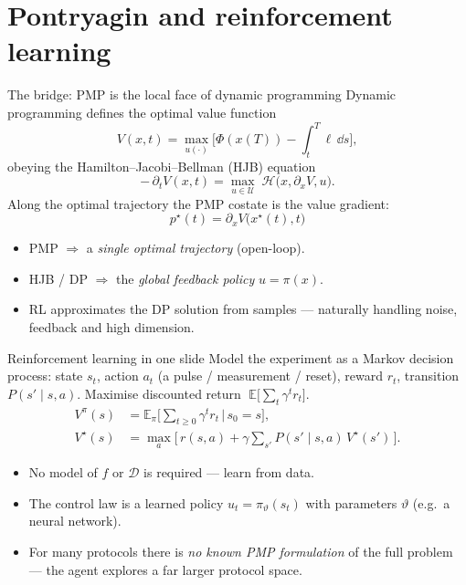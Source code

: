 \documentclass[10pt,aspectratio=169]{beamer}
\newcommand{\Hc}{\mathcal{H}}                 %
\begin{document}
\section{Pontryagin and reinforcement learning}

\begin{frame}{The bridge: PMP is the local face of dynamic programming}
  Dynamic programming defines the optimal value function
  \[
    V(x,t)=\max_{u(\cdot)}\Big[\Phi(x(T))-\!\int_t^T\!\ell\,\dd s\Big],
  \]
  obeying the \alert{Hamilton--Jacobi--Bellman (HJB)} equation
  \begin{equation}
    -\,\partial_t V(x,t) = \max_{u\in\mathcal{U}}\;\Hc\big(x,\partial_x V,u\big).
  \end{equation}
  Along the optimal trajectory the PMP costate is the value gradient:
  \begin{equation}
    \boxed{\;p^\star(t) = \partial_x V\big(x^\star(t),t\big)\;}
  \end{equation}
  \begin{itemize}
    \item PMP $\Rightarrow$ a \emph{single optimal trajectory} (open-loop).
    \item HJB / DP $\Rightarrow$ the \emph{global feedback policy} $u=\pi(x)$.
    \item RL approximates the DP solution from samples --- naturally handling
          noise, feedback and high dimension.
  \end{itemize}
\end{frame}

\begin{frame}{Reinforcement learning in one slide}
  Model the experiment as a Markov decision process: state $s_t$, action $a_t$
  (a pulse / measurement / reset), reward $r_t$, transition $P(s'\!\mid s,a)$.
  Maximise discounted return $\;\mathbb{E}\big[\sum_t \gamma^t r_t\big]$.
  \begin{align}
    V^\pi(s) &= \mathbb{E}_\pi\Big[\textstyle\sum_{t\ge0}\gamma^t r_t \,\Big|\, s_0=s\Big], \\
    V^\star(s) &= \max_a\Big[\,r(s,a) + \gamma \textstyle\sum_{s'} P(s'\!\mid s,a)\,V^\star(s')\,\Big].
    \tag{Bellman optimality}
  \end{align}
  \begin{itemize}
    \item No model of $f$ or $\mathcal{D}$ is required --- learn from data.
    \item The control law is a learned policy $u_t=\pi_\vartheta(s_t)$ with
          parameters $\vartheta$ (e.g.\ a neural network).
    \item For many protocols there is \emph{no known PMP formulation} of the full
          problem --- the agent explores a far larger protocol space.
  \end{itemize}
\end{frame}
\end{document}
